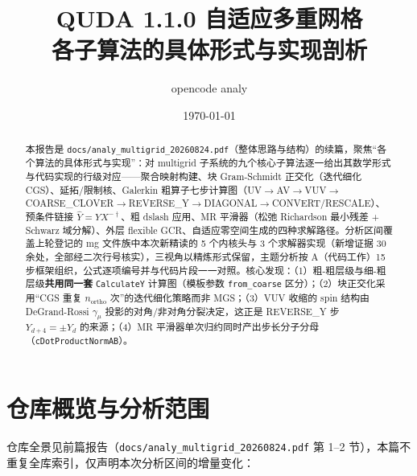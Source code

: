\documentclass[UTF8]{ctexart}
\title{QUDA 1.1.0 自适应多重网格\\各子算法的具体形式与实现剖析}
\author{opencode analy}
\date{\today}
\begin{document}
\maketitle

\begin{abstract}
本报告是 \texttt{\nolinkurl{docs/analy_multigrid_20260824.pdf}}（整体思路与结构）的续篇，聚焦``各个算法的具体形式与实现''：对 multigrid 子系统的九个核心子算法逐一给出其数学形式与代码实现的行级对应——聚合映射构建、块 Gram-Schmidt 正交化（迭代细化 CGS）、延拓/限制核、Galerkin 粗算子七步计算图（UV$\to$AV$\to$VUV$\to$COARSE\_CLOVER$\to$REVERSE\_Y$\to$DIAGONAL$\to$CONVERT/RESCALE）、预条件链接 $\hat Y=Y X^{-\dagger}$、粗 dslash 应用、MR 平滑器（松弛 Richardson 最小残差 + Schwarz 域分解）、外层 flexible GCR、自适应零空间生成的四种求解路径。分析区间覆盖上轮登记的 mg 文件族中本次新精读的 5 个内核头与 3 个求解器实现（新增证据 30 余处，全部经二次行号核实），三视角以精炼形式保留，主题分析按 A（代码工作）15 步框架组织，公式逐项编号并与代码片段一一对照。核心发现：（1）粗-粗层级与细-粗层级\textbf{共用同一套} \texttt{CalculateY} 计算图（模板参数 \texttt{from\_coarse} 区分）；（2）块正交化采用``CGS 重复 $n_{\text{ortho}}$ 次''的迭代细化策略而非 MGS；（3）VUV 收缩的 spin 结构由 DeGrand-Rossi $\gamma_\mu$ 投影的对角/非对角分裂决定，这正是 REVERSE\_Y 步 $Y_{d+4}=\pm Y_d$ 的来源；（4）MR 平滑器单次归约同时产出步长分子分母（\texttt{cDotProductNormAB}）。
\end{abstract}

\tableofcontents

\section{仓库概览与分析范围}

仓库全景见前篇报告（\texttt{\nolinkurl{docs/analy_multigrid_20260824.pdf}} 第 1--2 节），本篇不重复全库索引，仅声明本次分析区间的增量变化：
\end{document}
